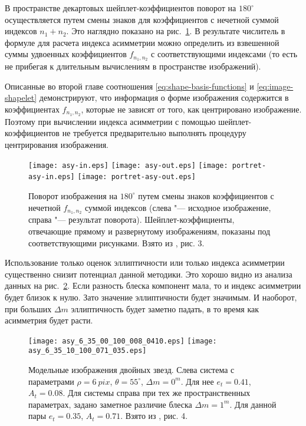 В пространстве декартовых шейплет-коэффициентов поворот на $180^\circ$ осуществляется путем смены знаков для коэффициентов с нечетной суммой индексов $n_1+n_2$. Это наглядно показано на рис.~\ref{fig:rotate180}. В результате числитель в формуле для расчета индекса асимметрии можно определить из взвешенной суммы удвоенных коэффициентов $f_{n_1,n_2}$ с соответствующими индексами (то есть не прибегая к длительным вычислениям в пространстве изображений). 

Описанные во второй главе соотношения \ref{eq:shape-basis-functions} и \ref{eq:image-shapelet} демонстрируют, что информация о форме изображения содержится в коэффициентах $f_{n_1,n_2}$, которые не зависят от того, как центрировано изображение. Поэтому при вычислении индекса асимметрии с помощью шейплет-коэффициентов не требуется предварительно выполнять процедуру центрирования изображения. 

\begin{figure}[pt]
\centering
\texttt{[image: asy-in.eps]}
\texttt{[image: asy-out.eps]}
\texttt{[image: portret-asy-in.eps]}
\texttt{[image: portret-asy-out.eps]}
\caption{Поворот изображения на $180^\circ$ путем смены знаков коэффициентов с нечетной $f_{n_1,n_2}$ суммой индексов (слева "--- исходное изображение, справа "--- результат поворота). Шейплет-коэффициенты, отвечающие прямому и развернутому изображениям, показаны под соответствующими рисунками. Взято из \cite{2018AstL...44..103K}, рис. 3.}
\label{fig:rotate180}
\end{figure}

Использование только оценок эллиптичности или только индекса асимметрии существенно снизит потенциал данной методики. Это хорошо видно из анализа данных на рис.~\ref{fig:bin-examples}. Если разность блеска компонент мала, то и индекс асимметрии будет близок к нулю. Зато значение эллиптичности будет значимым. И наоборот, при больших $\Delta m$ эллиптичность будет заметно падать, в то время как асимметрия будет расти.

\begin{figure}
\centering
\texttt{[image: asy\_6\_35\_00\_100\_008\_0410.eps]}
\texttt{[image: asy\_6\_35\_10\_100\_071\_035.eps]}
\caption{Модельные изображения двойных звезд. Слева система с параметрами $\rho=6~pix$, $\theta = 55^\circ$, $\Delta m=0^m$. Для нее $e_t = 0.41$, $A_t = 0.08$. Для системы справа при тех же пространственных параметрах, задано заметное различие блеска $\Delta m=1^m $. Для данной пары $e_t = 0.35$, $A_t = 0.71$. Взято из \cite{2018AstL...44..103K}, рис. 4.}
\label{fig:bin-examples}
\end{figure}

